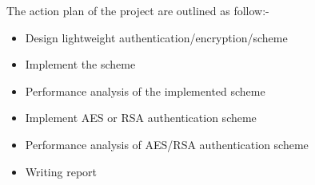 The action plan of the project are outlined as follow:-
\begin{itemize}
    \item Design lightweight authentication/encryption/scheme 
    \item Implement the scheme 
    \item Performance analysis of the  implemented scheme 
    \item Implement AES or RSA authentication scheme 
    \item Performance analysis of AES/RSA authentication scheme
    \item Writing report
\end{itemize}